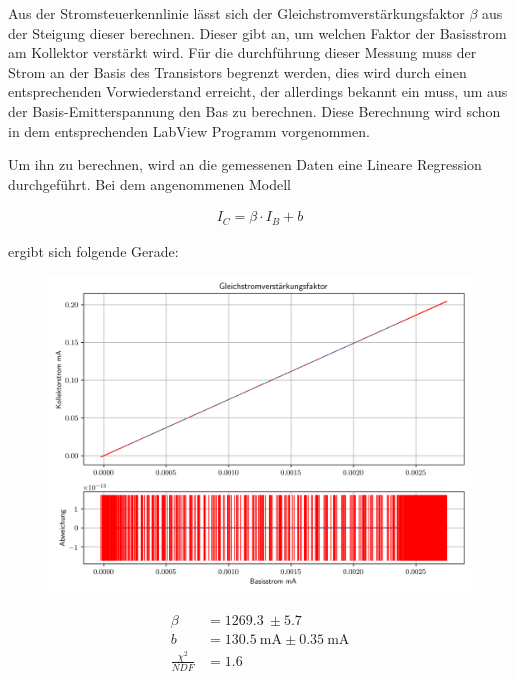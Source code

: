 \documentclass[12pt,twoside,a4paper]{scrartcl}
\begin{document}
        Aus der Stromsteuerkennlinie lässt sich der Gleichstromverstärkungsfaktor $\beta$ aus der Steigung dieser berechnen. Dieser gibt an, um welchen Faktor der Basisstrom am Kollektor verstärkt wird.
        Für die durchführung dieser Messung muss der Strom an der Basis des Transistors begrenzt werden, dies wird durch einen entsprechenden Vorwiederstand erreicht, der allerdings bekannt ein muss, um aus der Basis-Emitterspannung den Bas zu berechnen. Diese Berechnung wird schon in dem entsprechenden LabView Programm vorgenommen.

        Um ihn zu berechnen, wird an die gemessenen Daten eine Lineare Regression durchgeführt. Bei dem angenommenen Modell

        \begin{align*}
            I_C = \beta \cdot I_B + b
        \end{align*}

        ergibt sich folgende Gerade:

        \begin{figure}[H]
            \begin{minipage}{0.69 \textwidth}
                \includegraphics[width = 0.8 \textwidth]{Plots/Transistor/gsvf}
            \end{minipage}
            \begin{minipage}{0.29 \textwidth}
                \begin{align*}
                    \beta &= \SI{1269.3}{} \pm \SI{5.7}{} \\
                    b &= \SI{130.5}{\milli \ampere} \pm \SI{0.35}{\milli \ampere} \\
                    \frac{\chi^2}{NDF} &= 1.6
                \end{align*}
            \end{minipage}
        \end{figure}
\end{document}
